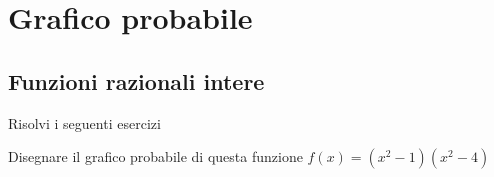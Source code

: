 \chapter{Grafico probabile}
\section{Funzioni razionali intere}
Risolvi i seguenti esercizi
\tcbstartrecording
%
%	
%	
%	
%		
%		
%		
%		
%		
%		
\begin{exercise}[no solution]
	Disegnare il grafico probabile di questa funzione $f(x)=(x^2-1)(x^2-4)$
\end{exercise}
